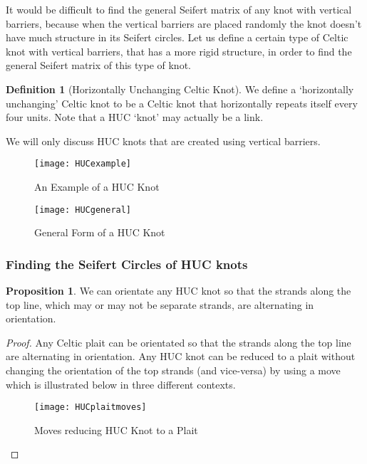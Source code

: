 \documentclass[10pt,a4paper]{report}
\theoremstyle{definition}
\newtheorem{definition}{Definition}[section]
\newtheorem{proposition}{Proposition}
\theoremstyle{remark}
\theoremstyle{example}
\begin{document}
 It would be difficult to find the general Seifert matrix of any knot with vertical barriers, because when the vertical barriers are placed randomly the knot doesn't have much structure in its Seifert circles. Let us define a certain type of Celtic knot with vertical barriers, that has a more rigid structure, in order to find the general Seifert matrix of this type of knot.
 
\begin{definition}[Horizontally Unchanging Celtic Knot]
 We define a `horizontally unchanging' Celtic knot to be a Celtic knot that horizontally repeats itself every four units. Note that a HUC `knot' may actually be a link.
\end{definition}

 We will only discuss HUC knots that are created using vertical barriers.
 
 \begin{figure}[H]
\centering
\graphicspath{{/Users/Imogen/Desktop/seifertimages/lapath/}}
\texttt{[image: HUCexample]}
\caption{An Example of a HUC Knot}
\label{HUCexample}
\end{figure}

 \begin{figure}[H]
\centering
\graphicspath{{/Users/Imogen/Desktop/seifertimages/lapath/}}
\texttt{[image: HUCgeneral]}
\caption{General Form of a HUC Knot}
\label{HUCgeneral}
\end{figure}

\subsubsection{Finding the Seifert Circles of HUC knots} 

\begin{proposition}
We can orientate any HUC knot so that the strands along the top line, which may or may not be separate strands, are alternating in orientation.
\end{proposition}

\begin{proof}
Any Celtic plait can be orientated so that the strands along the top line are alternating in orientation. Any HUC knot can be reduced to a plait without changing the orientation of the top strands (and vice-versa) by using a move which is illustrated below in three different contexts.

 \begin{figure}[H]
\centering
\graphicspath{{/Users/Imogen/Desktop/seifertimages/lapath/}}
\texttt{[image: HUCplaitmoves]}
\caption{Moves reducing HUC Knot to a Plait}
\label{HUCplaitmoves}
\end{figure}
\end{proof}
\end{document}
